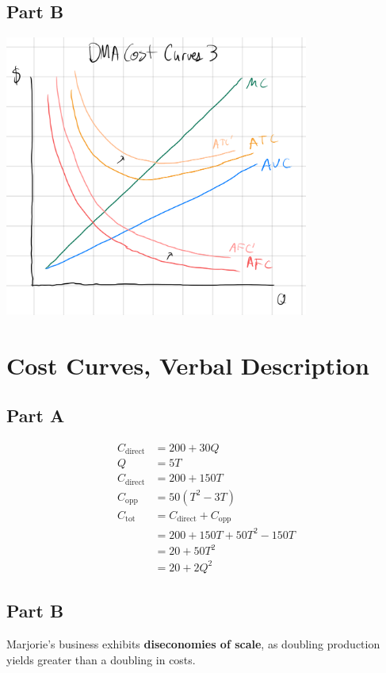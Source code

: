 \documentclass[8pt]{extarticle}
\newcommand{\plain}[1]{\textrm{#1}}
\begin{document}
{\subsection*{Part B}
\begin{center}
	\includegraphics[width=10cm]{HW7Q4B}
\end{center}
\section{Cost Curves, Verbal Description}
\label{sec:Cost Curves, Verbal Description}
\subsection*{Part A}
\begin{align*}
	\label{eq:}
	C_{\plain{direct}} &= 200 + 30Q \\
	Q &= 5T \\
	C_{\plain{direct}} &= 200 + 150T \\
	C_{\plain{opp}} &= 50(T^2 - 3T) \\
	C_{\plain{tot}} &= C_{\plain{direct}} + C_{\plain{opp}} \\
	&= 200 + 150T + 50T^2 - 150T \\
	&= 20 + 50T^2 \\
	&= \boxed{20 + 2Q^2}
\end{align*}
\subsection*{Part B}
Marjorie's business exhibits \textbf{diseconomies of scale}, as doubling production yields greater than a doubling in costs.
}
\end{document}

